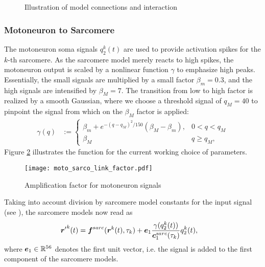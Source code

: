 \begin{figure}[!htp]
\begin{center}
%
    \end{center}%
    \caption{Illustration of model connections and interaction}
    \label{fig:modelconn}
\end{figure}

\subsubsection{Motoneuron to Sarcomere}
The motoneuron soma signals $q^k_2(t)$ are used to provide activation spikes for the $k$-th sarcomere.
As the sarcomere model merely reacts to high spikes, the motoneuron output is scaled by a nonlinear function $\gamma$ to emphasize high peaks.
Essentially, the small signals are multiplied by a small factor $\beta_m = 0.3$, and the high signals are intensified by $\beta_M = 7$.
The transition from low to high factor is realized by a smooth Gaussian,
where we choose a threshold signal of $q_M = 40$ to pinpoint the signal from which on the $\beta_M$ factor is applied:
\begin{align}
	\gamma(q) &:= \begin{cases}
		\beta_m + e^{-(q-q_M)^2/150}(\beta_M-\beta_m), & 0 < q < q_M\\
		\beta_M & q \geq q_M,
	\end{cases}
\end{align}
Figure \ref{fig:MSLink} illustrates the function for the current working choice of parameters.
\begin{figure}[!ht]
	\centering
	\texttt{[image: moto\_sarco\_link\_factor.pdf]}
	\caption{Amplification factor for motoneuron signals}
	\label{fig:MSLink}
\end{figure}
Taking into account division by sarcomere model constants for the input signal (see \cite{Shorten2007}), the sarcomere models now read as
\begin{align}
	{\boldsymbol{r}'}^k(t) &= \boldsymbol{f}^{sarc}(\boldsymbol{r}^k(t),\tau_k) + \boldsymbol{e}_1 \frac{\gamma(q_2^k(t))}{\boldsymbol{c}^{sarc}_1(\tau_k)}q_2^k(t),\label{def:sarcosys_plus_moto}
\end{align}
where $\boldsymbol{e}_1 \in \mathbb{R}^{56}$ denotes the first unit vector, i.e. the signal is added to the first component of the sarcomere models.

